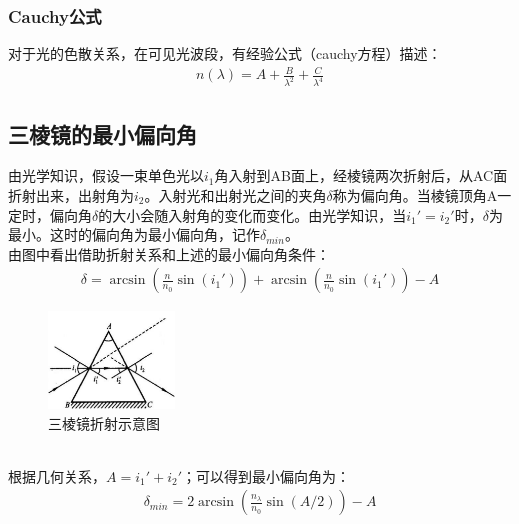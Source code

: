 \documentclass[UTF8]{ctexart}
\begin{document}
\subsubsection{Cauchy公式}
对于光的色散关系，在可见光波段，有经验公式（cauchy方程）描述：\\
\begin{align}
    n(\lambda)=A+\frac{B}{\lambda^2}+\frac{C}{\lambda^4}
\end{align}

\subsection{三棱镜的最小偏向角}
由光学知识，假设一束单色光以$i_1$角入射到AB面上，经棱镜两次折射后，从AC面折射出来，出射角为$i_2$。入射光和出射光之间的夹角$\delta$称为偏向角。当棱镜顶角A一定时，偏向角$\delta$的大小会随入射角的变化而变化。由光学知识，当$i_1'=i_2'$时，$\delta$为最小。这时的偏向角为最小偏向角，记作$\delta_{min}$。\\
由图中看出借助折射关系和上述的最小偏向角条件：
\begin{align}
    \delta=\arcsin(\frac{n}{n_0}\sin(i_1'))+\arcsin(\frac{n}{n_0}\sin(i_1'))-A
\end{align}
\begin{figure}[h]
    \centering
    \includegraphics[width=0.3\textwidth]{tri.png}
    \caption{三棱镜折射示意图}
    \label{fig:tri}
\end{figure}
\\
根据几何关系，$A=i_1'+i_2'$；可以得到最小偏向角为：
\begin{align}
    \delta_{min}=2\arcsin(\frac{n_{\lambda}}{n_0}\sin(A/2))-A
\end{align}
\end{document}
